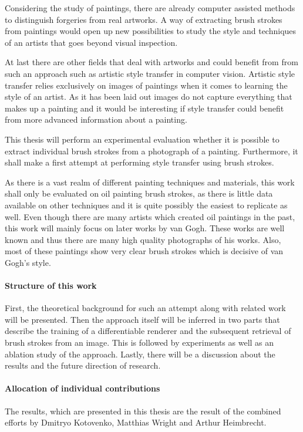 Considering the study of paintings, there are already computer assisted methods to distinguish forgeries from real artworks.
A way of extracting brush strokes from paintings would open up new possibilities to study the style and techniques of an artists that goes beyond visual inspection.

At last there are other fields that deal with artworks and could benefit from from such an approach such as artistic style transfer in computer vision.
Artistic style transfer relies exclusively on images of paintings when it comes to learning the style of an artist.
As it has been laid out images do not capture everything that makes up a painting and it would be interesting if style transfer could benefit from more advanced information about a painting.

This thesis will perform an experimental evaluation whether it is possible to extract individual brush strokes from a photograph of a painting.
Furthermore, it shall make a first attempt at performing style transfer using brush strokes.

As there is a vast realm of different painting techniques and materials, this work shall only be evaluated on oil painting brush strokes, as there is little data available on other techniques and it is quite possibly the easiest to replicate as well.
Even though there are many artists which created oil paintings in the past, this work will mainly focus on later works by van Gogh.
These works are well known and thus there are many high quality photographs of his works.
Also, most of these paintings show very clear brush strokes which is decisive of van Gogh's style.



\paragraph{Structure of this work}
First, the theoretical background for such an attempt along with related work will be presented.
Then the approach itself will be inferred in two parts that describe the training of a differentiable renderer
and the subsequent retrieval of brush strokes from an image.
This is followed by experiments as well as an ablation study of the approach.
Lastly, there will be a discussion about the results and the future direction of research.



\paragraph{Allocation of individual contributions}
The results, which are presented in this thesis are the result of the combined efforts by Dmitryo Kotovenko, Matthias Wright and Arthur Heimbrecht.




